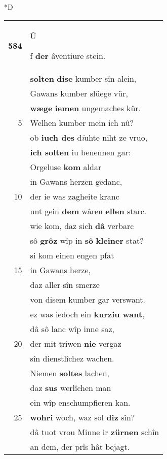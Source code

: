 \documentclass[8pt,a4paper,notitlepage]{article}
\begin{document}
\begin{table}[ht]
\begin{minipage}[t]{0.5\linewidth}
\small
\begin{center}*D
\end{center}
\begin{tabular}{rl}
\textbf{584} & \begin{large}Û\end{large}f \textbf{der} âventiure stein.\\ 
 & \textbf{solten} \textbf{dise} kumber sîn alein,\\ 
 & Gawans kumber slüege vür,\\ 
 & \textbf{wæge} \textbf{iemen} ungemaches kür.\\ 
5 & Welhen kumber mein ich nû?\\ 
 & ob \textbf{iuch des} d\textit{i}uhte niht ze vruo,\\ 
 & \textbf{ich solte}\textbf{n} iu benennen gar:\\ 
 & Orgeluse \textbf{kom} aldar\\ 
 & in Gawans herzen gedanc,\\ 
10 & der ie was zagheite kranc\\ 
 & unt gein \textbf{dem} wâren \textbf{ellen} starc.\\ 
 & wie kom, daz sich \textbf{dâ} verbarc\\ 
 & sô \textbf{grôz} wîp in \textbf{sô} \textbf{kleiner} stat?\\ 
 & si kom einen engen pfat\\ 
15 & in Gawans herze,\\ 
 & daz aller sîn smerze\\ 
 & von disem kumber gar verswant.\\ 
 & ez was iedoch ein \textbf{kurziu want},\\ 
 & dâ sô lanc wîp inne saz,\\ 
20 & der mit triwen \textbf{nie} vergaz\\ 
 & sîn dienstlîchez wachen.\\ 
 & Niemen \textbf{solte}\textbf{s} lachen,\\ 
 & daz \textbf{sus} werlîchen man\\ 
 & ein wîp enschumpfieren kan.\\ 
25 & \textbf{wohri} woch, waz sol \textbf{diz} sîn?\\ 
 & dâ tuot vrou Minne ir \textbf{zürnen} schîn\\ 
 & an dem, der prîs hât bejagt.\\ 

\end{tabular}
\end{minipage}
\end{table}
\end{document}
